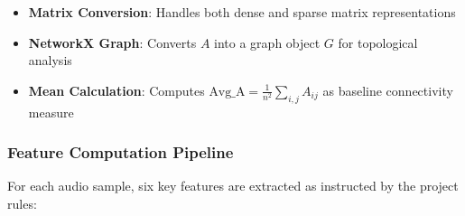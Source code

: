 \documentclass{article}
\begin{document}
\begin{itemize}
    \item \textbf{Matrix Conversion}: Handles both dense and sparse matrix representations
    \item \textbf{NetworkX Graph}: Converts $A$ into a graph object $G$ for topological analysis
    \item \textbf{Mean Calculation}: Computes $\text{Avg\_A} = \frac{1}{n^2}\sum_{i,j}A_{ij}$ as baseline connectivity measure
\end{itemize}

\subsubsection{Feature Computation Pipeline}
For each audio sample, six key features are extracted as instructed by the project rules:
\end{document}
